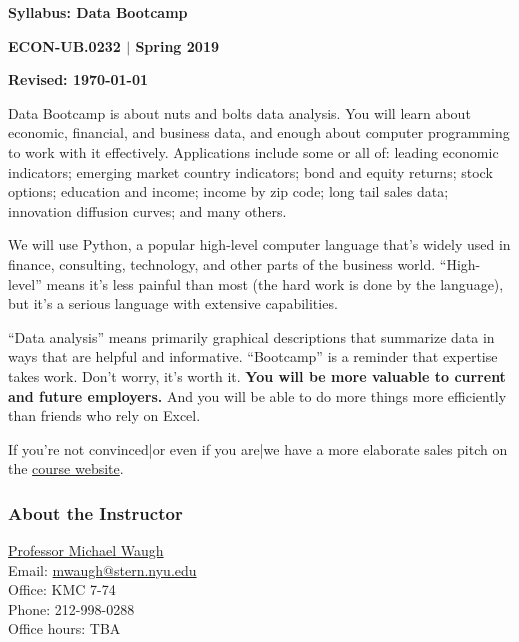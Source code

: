 



\pagestyle{headandfoot}
\runningheadrule
\firstpageheadrule
{}
\runningfooter{}{}{}


\centerline{\Large\bf Syllabus:  Data Bootcamp}
\vspace{3mm}
\centerline{\large\bf ECON-UB.0232 $|$ Spring 2019}
\vspace{3mm}
\centerline{\bf Revised:  \today}

\bigskip

Data Bootcamp is about nuts and bolts data analysis. You will learn about economic, financial, and business
data, and enough about computer programming to work with it effectively. Applications include some or all of: leading economic indicators; emerging market country indicators; bond and equity returns; stock options; education and income; income by zip code; long tail sales data; innovation diffusion curves; and many others.

We will use Python, a popular high-level computer language that's widely used in finance, consulting,
technology, and other parts of the business world. ``High-level'' means it's less painful than most (the hard work is done by the language), but it's a serious language with extensive capabilities.

``Data analysis'' means primarily graphical descriptions that summarize data
in ways that are helpful and informative. ``Bootcamp'' is a reminder that expertise takes work. Don't worry, it's worth it. {\bf You will be more valuable to current and future employers.\/} And you will be able to do more things more efficiently than friends who rely on Excel.

If you're not convinced|or even if you are|we have a more elaborate sales pitch on the
\href{https://nyu.data-bootcamp.com/}{course website}.

\subsubsection*{About the Instructor}
\href{http://www.waugheconomics.com}{Professor Michael Waugh} \\
Email: \href{mailto:mailto:mwaugh@stern.nyu.edu}{mwaugh@stern.nyu.edu}\\
Office: KMC 7-74\\
Phone: 212-998-0288\\
Office hours: TBA


